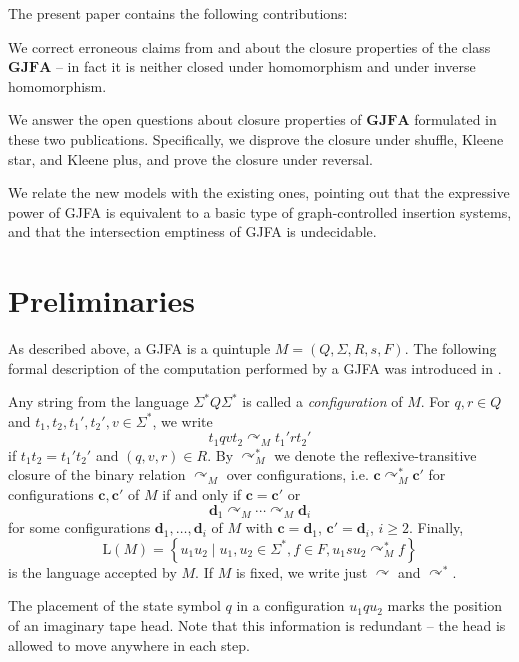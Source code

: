 \documentclass{ws-ijmpc}
\begin{document}
The present paper contains the following contributions:
\begin{romanlist}
\item We correct erroneous claims from \citep{athMED1} and \citep{athMED1book}
about the closure properties of the class $\mathbf{GJFA}$ -- in fact
it is neither closed under homomorphism and under inverse homomorphism.
\item We answer the open questions about closure properties of $\mathbf{GJFA}$
formulated in these two publications. Specifically, we disprove the
closure under shuffle, Kleene star, and Kleene plus, and prove the
closure under reversal.
\item We relate the new models with the existing ones, pointing out that
the expressive power of GJFA is equivalent to a basic type of graph-controlled
insertion systems, and that the intersection emptiness of GJFA is
undecidable.
\end{romanlist}

\section{Preliminaries}

As described above, a GJFA is a quintuple $M=\left(Q,\Sigma,R,s,F\right)$.
The following formal description of the computation performed by a
GJFA was introduced in \citep{athMED1}.
\begin{definition}
Any string from the language $\Sigma^{*}Q\Sigma^{*}$ is called a
\emph{configuration }of $M$. For $q,r\in Q$ and $t_{1},t_{2},t_{1}',t_{2}',v\in\Sigma^{*}$,
we write 
\[
t_{1}qvt_{2}\curvearrowright_{M}t_{1}'rt_{2}'
\]
if $t_{1}t_{2}=t_{1}'t_{2}'$ and $\left(q,v,r\right)\in R$. By $\curvearrowright_{M}^{*}$
we denote the reflexive-transitive closure of the binary relation
$\curvearrowright_{M}$ over configurations, i.e. $\mathbf{c}\curvearrowright_{M}^{*}\mathbf{c}'$
for configurations $\mathbf{c},\mathbf{c}'$ of $M$ if and only if
$\mathbf{c}=\mathbf{c}'$ or 
\[
\mathbf{d}_{1}\curvearrowright_{M}\cdots\curvearrowright_{M}\mathbf{d}_{i}
\]
for some configurations $\mathbf{d}_{1},\dots,\mathbf{d}_{i}$ of
$M$ with $\mathbf{c}=\mathbf{d}_{1}$, $\mathbf{c}'=\mathbf{d}_{i}$,
$i\ge2$. Finally,
\[
\mathrm{L}\!\left(M\right)=\left\{ u_{1}u_{2}\mid u_{1},u_{2}\in\Sigma^{*},f\in F,u_{1}su_{2}\curvearrowright_{M}^{*}f\right\} 
\]
is the language accepted by $M$. If $M$ is fixed, we write just
$\curvearrowright$ and $\curvearrowright^{*}$.
\end{definition}
The placement of the state symbol $q$ in a configuration $u_{1}qu_{2}$
marks the position of an imaginary tape head. Note that this information
is redundant -- the head is allowed to move anywhere in each step. 
\end{document}
